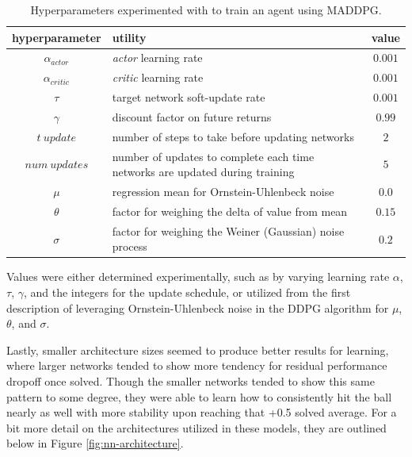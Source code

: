 \documentclass[11pt]{article}
\begin{document}
	\FloatBarrier
	
	\begin{table}[!ht]
		\centering
		\begin{tabular}{ c | p{6cm} | c }
			\textbf{hyperparameter} & \textbf{utility} & \textbf{value} \\
			\hline
			$\alpha_{actor}$ & \textit{actor} learning rate & $0.001$ \\
			$\alpha_{critic}$ & \textit{critic} learning rate & $0.001$ \\
			$\tau$ & target network soft-update rate & $0.001$ \\
			$\gamma$ & discount factor on future returns & $0.99$ \\
			$t\ update$ & number of steps to take before updating networks & $2$ \\
			$num\ updates$ & number of updates to complete each time networks are updated during training & $5$ \\
			$\mu$ & regression mean for Ornstein-Uhlenbeck noise & $0.0$ \\
			$\theta$ & factor for weighing the delta of value from mean & $0.15$ \\
			$\sigma$ & factor for weighing the Weiner (Gaussian) noise process & $0.2$ \\
			\hline
		\end{tabular}
		\caption{Hyperparameters experimented with to train an agent using MADDPG.}
		\label{tbl:parameters}
	\end{table}
	
	Values were either determined experimentally, such as by varying learning rate $\alpha$, $\tau$, $\gamma$, and the integers for the update schedule, or utilized from the first description of leveraging Ornstein-Uhlenbeck noise in the DDPG algorithm \cite{ddpg} for $\mu$, $\theta$, and $\sigma$.
	
	Lastly, smaller architecture sizes seemed to produce better results for learning, where larger networks tended to show more tendency for residual performance dropoff once solved. Though the smaller networks tended to show this same pattern to some degree, they were able to learn how to consistently hit the ball nearly as well with more stability upon reaching that +0.5 solved average. For a bit more detail on the architectures utilized in these models, they are outlined below in Figure \ref{fig:nn-architecture}.
	
	\FloatBarrier
	
\end{document}
